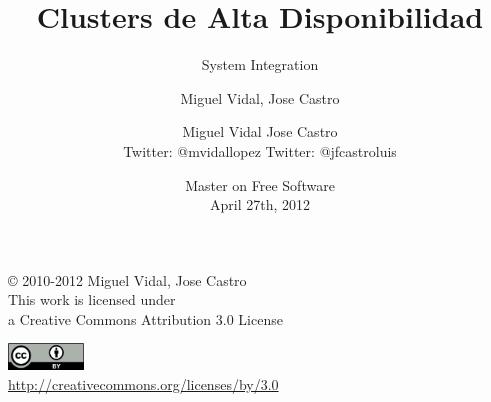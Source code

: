 \documentclass{beamer}
\begin{document}
\title{Clusters de Alta Disponibilidad}
\subtitle{System Integration}
\author{Miguel Vidal, Jose Castro} 
\date{\footnotesize{Master on Free Software \\ April 27th, 2012}}
\author{Miguel Vidal \hspace{1cm} Jose Castro \\
\hspace{0.5mm} {\tiny Twitter: @mvidallopez \hspace{1.1cm}Twitter: @jfcastroluis}
}



\begin{frame}
  \vspace{2cm}
  \begin{flushright}
    {\small \copyright{} 2010-2012 Miguel Vidal, Jose Castro} \\
    \medskip
    {\scriptsize This work is licensed under \\ a Creative Commons Attribution 3.0 License}
  \end{flushright}
  \begin{flushright}
    \href{http://creativecommons.org/licenses/by/3.0/es}{\includegraphics[width=2cm]{format/cc-by.png}} \\
    {\tiny \url{http://creativecommons.org/licenses/by/3.0}}
  \end{flushright}
\end{frame}%

\usebackgroundtemplate{}

\end{document}
